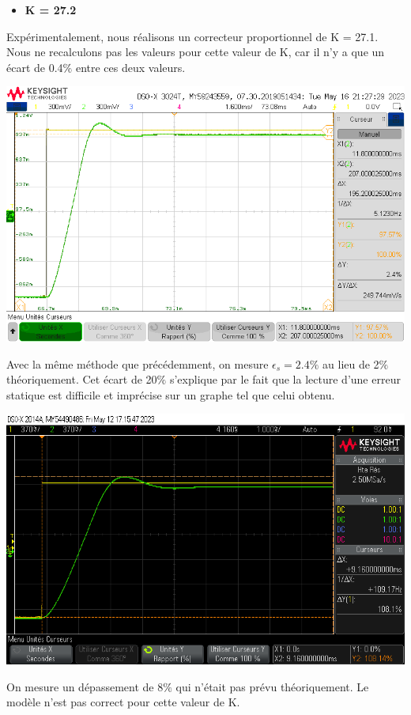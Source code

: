 \documentclass[12pt]{article}
\begin{document}
\begin{itemize}
\item \bf \large K = 27.2
\end{itemize}
Expérimentalement, nous réalisons un correcteur proportionnel de K = 27.1. Nous ne recalculons pas les valeurs pour cette valeur de K, car il n'y a que un écart de 0.4$\%$ entre ces deux valeurs.
\begin{center}
    \includegraphics[width = 16 cm]{TP3/Syst_1/P/estat-syst1-k27,2.png}
\end{center}
Avec la même méthode que précédemment, on mesure $\epsilon_s = 2.4\%$ au lieu de 2$\%$ théoriquement. Cet écart de 20$\%$ s'explique par le fait que la lecture d'une erreur statique est difficile et imprécise sur un graphe tel que celui obtenu.
\begin{center}
    \includegraphics[width = 16 cm]{TP3/Syst_1/P/k27_2_dep.png}
\end{center}
On mesure un dépassement de 8$\%$ qui n'était pas prévu théoriquement. Le modèle n'est pas correct pour cette valeur de K.
\end{document}

